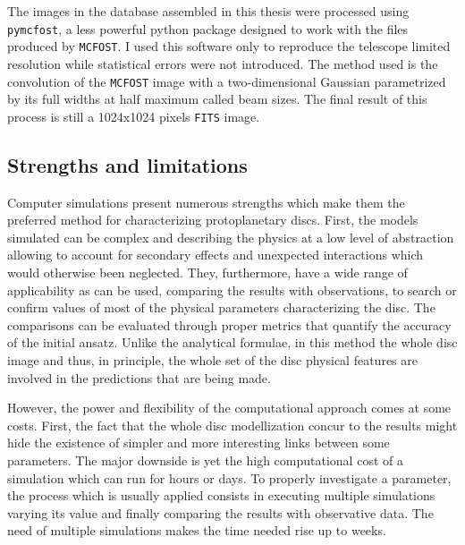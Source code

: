 \documentclass[a4paper,10pt]{report}
\begin{document}
The images in the database assembled in this thesis were processed using \lstinline{pymcfost}, a less powerful 
python package designed to work with the files produced by \lstinline{MCFOST}.
I used this software only to reproduce the telescope limited resolution while statistical errors were not introduced.
The method used is the convolution of the \lstinline{MCFOST} image with a two-dimensional Gaussian parametrized 
by its full widths at half maximum called beam sizes.
The final result of this process is still a 1024x1024 pixels \lstinline{FITS} image.

\subsection{Strengths and limitations}

Computer simulations present numerous strengths which make them the preferred 
method for characterizing protoplanetary discs. First, the models simulated can be 
complex and describing the physics at a low level of abstraction
allowing to account for secondary effects and unexpected interactions which would otherwise been neglected.
They, furthermore, have a wide range of applicability as can be used, comparing the results with observations, to 
search or confirm values of most of the physical parameters characterizing the disc. 
The comparisons can be evaluated through
proper metrics that quantify the accuracy of the initial ansatz.
Unlike the analytical formulae, in this method the whole disc image and thus, in principle, the whole set of the
disc physical features are involved in the predictions that are being made.

However, the power and flexibility of the computational approach comes at some costs.
First, the fact that the whole disc modellization concur to the results might hide 
the existence of simpler and more interesting links between some parameters.
The major downside is yet the high computational cost of a simulation
which can run for hours or days. To properly investigate a parameter, the process which
is usually applied consists in executing multiple simulations varying its value and finally
comparing the results with observative data.
The need of multiple simulations makes the time needed rise up to weeks.
\end{document}
